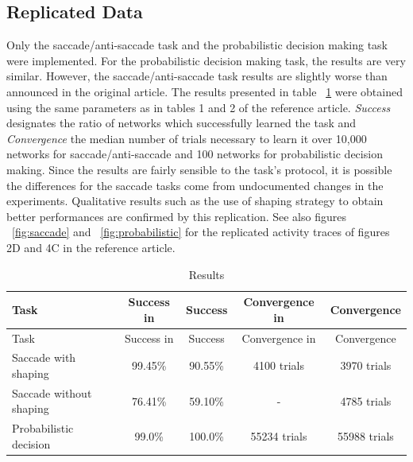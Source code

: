 \documentclass[10pt,a4paper,onecolumn]{article}
\begin{document}
\subsection{Replicated Data}\label{replicated-data}

Only the saccade/anti-saccade task and the probabilistic decision making
task were implemented. For the probabilistic decision making task, the
results are very similar. However, the saccade/anti-saccade task results
are slightly worse than announced in the original article. The results
presented in table ~\ref{tbl:results} were obtained using the same
parameters as in tables 1 and 2 of the reference article. \emph{Success}
designates the ratio of networks which successfully learned the task and
\emph{Convergence} the median number of trials necessary to learn it
over 10,000 networks for saccade/anti-saccade and 100 networks for
probabilistic decision making. Since the results are fairly sensible to
the task's protocol, it is possible the differences for the saccade
tasks come from undocumented changes in the experiments. Qualitative
results such as the use of shaping strategy to obtain better
performances are confirmed by this replication. See also figures
~\ref{fig:saccade} and ~\ref{fig:probabilistic} for the replicated
activity traces of figures 2D and 4C in the reference article.

\hypertarget{tbl:results}{}
\begin{longtable}[]{@{}lcccc@{}}
\caption{\label{tbl:results}Results }\tabularnewline
\toprule
Task & Success in \autocite{rombouts:2015} & Success & Convergence in
\autocite{rombouts:2015} & Convergence\tabularnewline
\midrule
\endfirsthead
\toprule
Task & Success in \autocite{rombouts:2015} & Success & Convergence in
\autocite{rombouts:2015} & Convergence\tabularnewline
\midrule
\endhead
Saccade with shaping & 99.45\% & 90.55\% & 4100 trials & 3970
trials\tabularnewline
Saccade without shaping & 76.41\% & 59.10\% & - & 4785
trials\tabularnewline
Probabilistic decision & 99.0\% & 100.0\% & 55234 trials & 55988
trials\tabularnewline
\bottomrule
\end{longtable}
\end{document}
